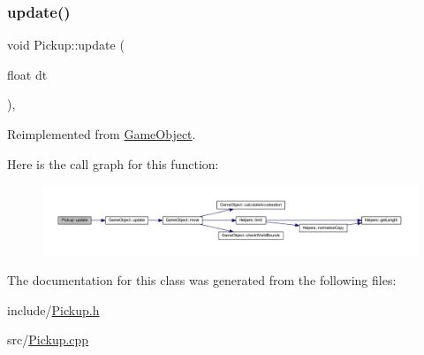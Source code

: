 \subsubsection{\texorpdfstring{update()}{update()}}
{\footnotesize\ttfamily void Pickup\+::update (\begin{DoxyParamCaption}\item[{float}]{dt }\end{DoxyParamCaption})\hspace{0.3cm}{\ttfamily [override]}, {\ttfamily [virtual]}}



Reimplemented from \hyperlink{class_game_object_a2fece397b6343682d639f8943f124d0e}{Game\+Object}.

Here is the call graph for this function\+:
\nopagebreak
\begin{figure}[H]
\begin{center}
\leavevmode
\includegraphics[width=350pt]{class_pickup_a009910dfc9488746b3944cfcdd5be7e9_cgraph}
\end{center}
\end{figure}


The documentation for this class was generated from the following files\+:\begin{DoxyCompactItemize}
\item 
include/\hyperlink{_pickup_8h}{Pickup.\+h}\item 
src/\hyperlink{_pickup_8cpp}{Pickup.\+cpp}\end{DoxyCompactItemize}

